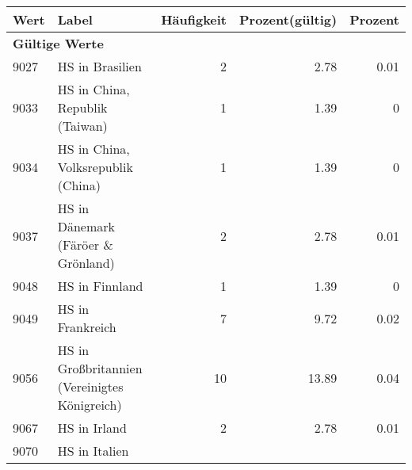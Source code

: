      \begin{longtable}{lXrrr}
     \toprule
     \textbf{Wert} & \textbf{Label} & \textbf{Häufigkeit} & \textbf{Prozent(gültig)} & \textbf{Prozent} \\
     \endhead
     \midrule
     \multicolumn{5}{l}{\textbf{Gültige Werte}}\\
        9027 & \multicolumn{1}{X}{HS in Brasilien} & %
          \num{2} &
          \num[round-mode=places,round-precision=2]{2,78} &
          \num[round-mode=places,round-precision=2]{0,01} \\
        9033 & \multicolumn{1}{X}{HS in China, Republik (Taiwan)} & %
          \num{1} &
          \num[round-mode=places,round-precision=2]{1,39} &
          \num[round-mode=places,round-precision=2]{0} \\
        9034 & \multicolumn{1}{X}{HS in China, Volksrepublik (China)} & %
          \num{1} &
          \num[round-mode=places,round-precision=2]{1,39} &
          \num[round-mode=places,round-precision=2]{0} \\
        9037 & \multicolumn{1}{X}{HS in Dänemark (Färöer \& Grönland)} & %
          \num{2} &
          \num[round-mode=places,round-precision=2]{2,78} &
          \num[round-mode=places,round-precision=2]{0,01} \\
        9048 & \multicolumn{1}{X}{HS in Finnland} & %
          \num{1} &
          \num[round-mode=places,round-precision=2]{1,39} &
          \num[round-mode=places,round-precision=2]{0} \\
        9049 & \multicolumn{1}{X}{HS in Frankreich} & %
          \num{7} &
          \num[round-mode=places,round-precision=2]{9,72} &
          \num[round-mode=places,round-precision=2]{0,02} \\
        9056 & \multicolumn{1}{X}{HS in Großbritannien (Vereinigtes Königreich)} & %
          \num{10} &
          \num[round-mode=places,round-precision=2]{13,89} &
          \num[round-mode=places,round-precision=2]{0,04} \\
        9067 & \multicolumn{1}{X}{HS in Irland} & %
          \num{2} &
          \num[round-mode=places,round-precision=2]{2,78} &
          \num[round-mode=places,round-precision=2]{0,01} \\
        9070 & \multicolumn{1}{X}{HS in Italien} & %

\end{longtable}
